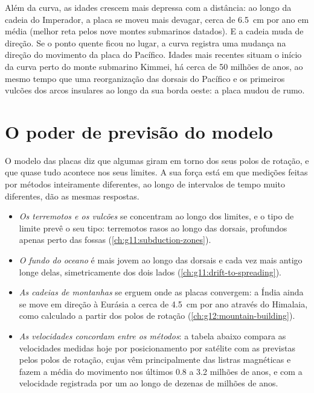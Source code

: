 Além da curva, as idades crescem mais depressa com a distância: ao longo da
cadeia do Imperador, a placa se moveu mais devagar, cerca de \qty{6.5}{cm}
por ano em média (melhor reta pelos nove montes submarinos datados). E a
cadeia muda de direção. Se o ponto quente ficou no lugar, a curva registra
uma mudança na direção do movimento da placa do Pacífico. Idades mais
recentes situam o início da curva perto do monte submarino Kimmei, há cerca
de 50 milhões de anos, ao mesmo tempo que uma reorganização das dorsais do
Pacífico e os primeiros vulcões dos arcos insulares ao longo da sua borda
oeste: a placa mudou de rumo.

\section{O poder de previsão do modelo}\label{sec:g11:plate-motions:predictive}

O modelo das placas diz que algumas  giram em torno dos seus
polos de rotação, e que quase tudo acontece nos seus limites. A sua força
está em que medições feitas por métodos inteiramente diferentes, ao longo de
intervalos de tempo muito diferentes, dão as mesmas respostas.

\begin{itemize}
  \item \emph{Os terremotos e os vulcões} se concentram ao longo dos limites,
        e o tipo de limite prevê o seu tipo: terremotos rasos ao longo das
        dorsais, profundos apenas perto das fossas (\cref{ch:g11:subduction-zones}).
  \item \emph{O fundo do oceano} é mais jovem ao longo das dorsais e cada vez
        mais antigo longe delas, simetricamente dos dois lados
        (\cref{ch:g11:drift-to-spreading}).
  \item \emph{As cadeias de montanhas} se erguem onde as placas convergem: a
        Índia ainda se move em direção à Eurásia a cerca de \qty{4.5}{cm} por
        ano através do Himalaia, como calculado a partir dos polos de rotação
        (\cref{ch:g12:mountain-building}).
  \item \emph{As velocidades concordam entre os métodos}: a tabela abaixo
        compara as velocidades medidas hoje por posicionamento por satélite
        com as previstas pelos polos de rotação, cujas  vêm
        principalmente das listras magnéticas e fazem a média do movimento
        nos últimos \num{0.8} a \num{3.2} milhões de anos, e com a velocidade
        registrada por um  ao longo de dezenas de
        milhões de anos.
\end{itemize}

